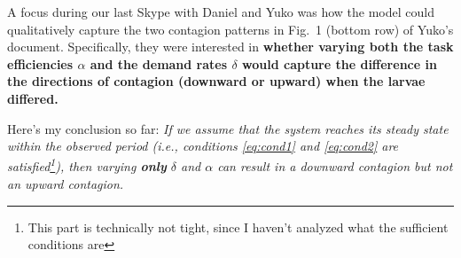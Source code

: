 \documentclass[10pt]{article}
\begin{document}
A focus during our last Skype with Daniel and Yuko was how the model could qualitatively capture the two contagion patterns in Fig.~1 (bottom row) of Yuko's document. Specifically, they were interested in \textbf{whether varying both the task efficiencies $\alpha$ and the demand rates $\delta$ would capture the difference in the directions of contagion (downward or upward) when the larvae differed.}

Here's my conclusion so far: {\color{red}\textit{If we assume that the system reaches its steady state within the observed period (i.e., conditions \eqref{eq:cond1} and \eqref{eq:cond2} are satisfied\footnote{This part is technically not tight, since I haven't analyzed what the sufficient conditions are}), then varying \textbf{only} $\delta$ and $\alpha$ can result in a downward contagion but not an upward contagion.}}
\end{document}

